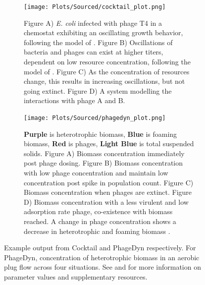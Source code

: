 \begin{figure}[h!]
    \centering
    \begin{subfigure}{0.49\linewidth}
        \centering
        \captionsetup{width=1\linewidth}
        \texttt{[image: Plots/Sourced/cocktail\_plot.png]}
        \caption{
            Figure A) \textit{E. coli} infected with phage T4 in a chemostat exhibiting an oscillating growth behavior, following the model of \citet{bohannanEffectResourceEnrichment1997}. 
            Figure B) Oscillations of bacteria and phages can exist at higher titers, dependent on low resource concentration, following the model of \citet{lenskiDynamicsInteractionsBacteria1988}. 
            Figure C) As the concentration of resources change, this results in increasing oscillations, but not going extinct. 
            Figure D) A system modelling the interactions with phage A and B. 
        }
        \label{fig:cocktail_software_output}
    \end{subfigure}
    \hfill
    \begin{subfigure}{0.49\linewidth}
        \centering
        \captionsetup{width=1\linewidth}
        \texttt{[image: Plots/Sourced/phagedyn\_plot.png]}
        \caption{
            \textcolor[HTML]{551A8C}{\textbf{Purple}} is heterotrophic biomass, 
            \textcolor[HTML]{4580B4}{\textbf{Blue}} is foaming biomass, 
            \textcolor[HTML]{FF0000}{\textbf{Red}} is phages, 
            \textcolor[HTML]{01E6EE}{\textbf{Light Blue}} is total suspended solids. 
            Figure A) Biomass concentration immediately post phage dosing. 
            Figure B) Biomass concentration with low phage concentration and maintain low concentration post spike in population count. 
            Figure C) Biomass concentration when phages are extinct. 
            Figure D) Biomass concentration with a less virulent and low adsorption rate phage, co-existence with biomass reached. 
            A change in phage concentration shows a decrease in heterotrophic and foaming biomass \cite{krysiak-baltynSimulationPhageDynamics2017}. 
        }
        \label{fig:PhageDyn_software_output}
    \end{subfigure}
    \caption{Example output from Cocktail and PhageDyn respectively. For PhageDyn, concentration of heterotrophic biomass in an aerobic plug flow across four situations.
        See \citet{nilssonCocktailComputerProgram2022} and \cite{krysiak-baltynSimulationPhageDynamics2017} for more information on parameter values and supplementary resources. 
    }
\end{figure}

